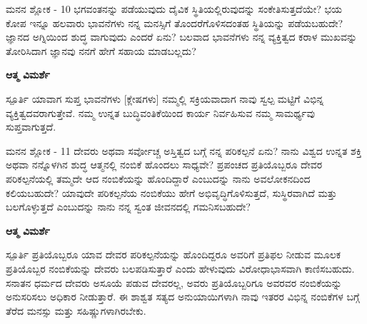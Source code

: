 
\newpage
\begin{mananam}{\mananamfont ಮನನ ಶ್ಲೋಕ - \textenglish{10}}
\footnotesize \mananamtext ಭಗವಂತನನ್ನು ಪಡೆಯುವುದು ದೈವಿಕ ಸ್ಥಿತಿಯಲ್ಲಿರುವುದನ್ನು ಸಂಕೇತಿಸುತ್ತದೆಯೇ? ಭಯ ಕೋಪ ಇನ್ನೂ ಹಲವಾರು ಭಾವನೆಗಳು ನನ್ನ ಮನಸ್ಸಿಗೆ ತೊಂದರೆಗೊಳಿಸದಂತಹ ಸ್ಥಿತಿಯನ್ನು ಪಡೆಯಬಹುದೇ? ಜ್ಞಾನದ ಅಗ್ನಿಯಿಂದ ಶುದ್ಧ ವಾಗುವುದು ಎಂದರೆ ಏನು? ಬಲವಾದ ಭಾವನೆಗಳು ನನ್ನ ವ್ಯಕ್ತಿತ್ವದ ಕರಾಳ ಮುಖವನ್ನು ತೋರಿಸಿದಾಗ ಜ್ಞಾನವು ನನಗೆ ಹೇಗೆ ಸಹಾಯ ಮಾಡಬಲ್ಲದು?
\end{mananam}
\WritingHand\enspace\textbf{ಆತ್ಮ ವಿಮರ್ಶೆ}\\
\begin{inspiration}{\mananamfont ಸ್ಪೂರ್ತಿ}
\footnotesize \mananamtext ಯಾವಾಗ ಸುಪ್ತ ಭಾವನೆಗಳು [ಕ್ಲೇಷಗಳು] ನಮ್ಮಲ್ಲಿ ಸಕ್ರಿಯವಾದಾಗ ನಾವು ಸ್ವಲ್ಪ ಮಟ್ಟಿಗೆ ವಿಭಿನ್ನ ವ್ಯಕ್ತಿತ್ವದವರಾಗುತ್ತೇವೆ. ನಮ್ಮ ಉನ್ನತ ಬುದ್ಧಿವಂತಿಕೆಯಿಂದ ಕಾರ್ಯ ನಿರ್ವಹಿಸುವ ನಮ್ಮ  ಸಾಮರ್ಥ್ಯವು ಸುಪ್ತವಾಗುತ್ತದೆ.
\end{inspiration}
\newpage


\newpage
\begin{mananam}{\mananamfont ಮನನ ಶ್ಲೋಕ - \textenglish{11}}
\footnotesize \mananamtext ದೇವರು ಅಥವಾ ಸರ್ವೋಚ್ಚ ಅಸ್ತಿತ್ವದ ಬಗ್ಗೆ ನನ್ನ ಪರಿಕಲ್ಪನೆ ಏನು? ನಾನು ವಿಶ್ವದ ಉನ್ನತ ಶಕ್ತಿ ಅಥವಾ ನನ್ನೊಳಗಿನ ಶುದ್ಧ ಆತ್ಮನಲ್ಲಿ ನಂಬಿಕೆ ಹೊಂದಲು ಸಾಧ್ಯವೇ? ಪ್ರಪಂಚದ ಪ್ರತಿಯೊಬ್ಬರೂ ದೇವರ ಪರಿಕಲ್ಪನೆಯಲ್ಲಿ ತಮ್ಮದೇ ಆದ ನಂಬಿಕೆಯನ್ನು ಹೊಂದಿದ್ದಾರೆ ಎಂಬುದನ್ನು ನಾನು ಅವಲೋಕನದಿಂದ ಕಲಿಯಬಹುದೇ? ಯಾವುದೇ ಪರಿಕಲ್ಪನೆಯ ನಂಬಿಕೆಯು ಹೇಗೆ ಅಭಿವೃದ್ಧಿಗೊಳಿಸುತ್ತದೆ, ಸುಸ್ಥಿರವಾಗಿದೆ ಮತ್ತು ಬಲಗೊಳ್ಳುತ್ತದೆ ಎಂಬುದನ್ನು ನಾನು ನನ್ನ ಸ್ವಂತ ಜೀವನದಲ್ಲಿ ಗಮನಿಸಬಹುದೇ?
\end{mananam}
\WritingHand\enspace\textbf{ಆತ್ಮ ವಿಮರ್ಶೆ}\\
\begin{inspiration}{\mananamfont ಸ್ಪೂರ್ತಿ}
\footnotesize \mananamtext ಪ್ರತಿಯೊಬ್ಬರೂ ಯಾವ ದೇವರ ಪರಿಕಲ್ಪನೆಯನ್ನು ಹೊಂದಿದ್ದರೂ ಅವರಿಗೆ ಪ್ರತಿಫಲ ನೀಡುವ ಮೂಲಕ ಪ್ರತಿಯೊಬ್ಬರ ನಂಬಿಕೆಯನ್ನು ದೇವರು ಬಲಪಡಿಸುತ್ತಾರೆ ಎಂದು ಹೇಳುವುದು ವಿರೋಧಾಭಾಸವಾಗಿ ಕಾಣಿಸಬಹುದು. ಸನಾತನ ಧರ್ಮದ ದೇವರು ಅಸೂಯೆ ಪಡುವ ದೇವರಲ್ಲ, ಅವರು ಪ್ರತಿಯೊಬ್ಬರಿಗೂ ಅವರವರ ನಂಬಿಕೆಯನ್ನು ಅನುಸರಿಸಲು ಅಧಿಕಾರ ನೀಡುತ್ತಾರೆ. ಈ ಶಾಶ್ವತ ಸತ್ಯದ ಅನುಯಾಯಿಗಳಾಗಿ ನಾವು ಇತರರ ವಿಭಿನ್ನ ನಂಬಿಕೆಗಳ ಬಗ್ಗೆ ತೆರೆದ ಮನಸ್ಸು ಮತ್ತು ಸಹಿಷ್ಣುಗಳಾಗಿರಬೇಕು.
\end{inspiration}
\newpage

